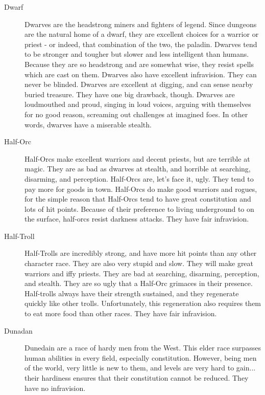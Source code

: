 \begin{description}
\item[Dwarf] Dwarves are the headstrong miners and fighters of legend.
     Since dungeons are the natural home of a dwarf, they are
     excellent choices for a warrior or priest - or indeed, that
     combination of the two, the paladin. Dwarves tend to be
     stronger and tougher but slower and less intelligent than
     humans. Because they are so headstrong and are somewhat wise,
     they resist spells which are cast on them. Dwarves also have
     excellent infravision. They can never be blinded. Dwarves
     are excellent at digging, and can sense nearby buried treasure.
     They have one big drawback, though. Dwarves are loudmouthed and
     proud, singing in loud voices, arguing with themselves for no
     good reason, screaming out challenges at imagined foes. In
     other words, dwarves have a miserable stealth.

\item[Half-Orc] Half-Orcs make excellent warriors and decent priests, but
     are terrible at magic. They are as bad as dwarves at stealth,
     and horrible at searching, disarming, and perception.
     Half-Orcs are, let's face it, ugly. They tend to pay more for
     goods in town. Half-Orcs do make good warriors and rogues,
     for the simple reason that Half-Orcs tend to have great
     constitution and lots of hit points. Because of their
     preference to living underground to on the surface, half-orcs
     resist darkness attacks. They have fair infravision.

\item[Half-Troll] Half-Trolls are incredibly strong, and have more hit points
     than any other character race. They are also very stupid and
     slow. They will make great warriors and iffy priests. They
     are bad at searching, disarming, perception, and stealth.
     They are so ugly that a Half-Orc grimaces in their presence.
     Half-trolls always have their strength sustained, and they
     regenerate quickly like other trolls. Unfortunately, this
     regeneration also requires them to eat more food than other
     races. They have fair infravision.

\item[Dunadan] Dunedain are a race of hardy men from the West. This elder
     race surpasses human abilities in every field, especially
     constitution. However, being men of the world, very little is
     new to them, and levels are very hard to gain... their
     hardiness ensures that their constitution cannot be reduced.
     They have no infravision.


\end{description}
